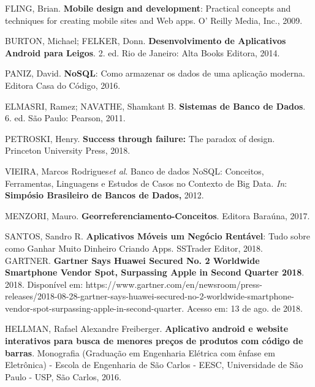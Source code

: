 FLING, Brian. \textbf{Mobile design and development}: Practical concepts and techniques for creating mobile sites and Web apps. O’ Reilly Media, Inc., 2009. 





 BURTON, Michael; FELKER, Donn. \textbf{Desenvolvimento de Aplicativos Android para Leigos}. 2. ed. Rio de Janeiro: Alta Books Editora, 2014.





PANIZ, David. \textbf{NoSQL}: Como armazenar os dados de uma aplicação moderna. Editora Casa do Código, 2016.





ELMASRI, Ramez; NAVATHE, Shamkant B. \textbf{Sistemas de Banco de Dados}. 6. ed. São Paulo: Pearson, 2011.




PETROSKI, Henry. \textbf{Success through failure:} The paradox of design. Princeton University Press, 2018.





VIEIRA, Marcos Rodrigues\tab  \textit{et al}. Banco de dados NoSQL:\textbf{ }Conceitos, Ferramentas, Linguagens e Estudos de Casos no Contexto de Big Data. \textit{In}: \textbf{Simpósio Brasileiro de Bancos de Dados,} 2012.





MENZORI, Mauro. \textbf{Georreferenciamento-Conceitos}. Editora Baraúna, 2017.





SANTOS, Sandro R. \textbf{Aplicativos Móveis um Negócio Rentável}: Tudo sobre como Ganhar Muito Dinheiro Criando Apps. SSTrader Editor, 2018.\\



GARTNER. \textbf{Gartner Says Huawei Secured No. 2 Worldwide Smartphone Vendor Spot, Surpassing Apple in Second Quarter 2018}. 2018. Disponível em: https://www.gartner.com/en/newsroom/press-releases/2018-08-28-gartner-says-huawei-secured-no-2-worldwide-smartphone-vendor-spot-surpassing-apple-in-second-quarter. Acesso em: 13 de ago. de 2018.





HELLMAN, Rafael Alexandre Freiberger. \textbf{Aplicativo android e website interativos para busca de menores preços de produtos com código de barras}. Monografia (Graduação em Engenharia Elétrica com ênfase em Eletrônica) - Escola de Engenharia de São Carlos - EESC, Universidade de São Paulo - USP, São Carlos, 2016. \\
 \\





